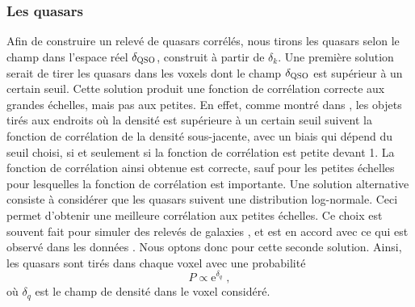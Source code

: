 \subsubsection{Les quasars}
\label{subsubsec:boiteqso}
Afin de construire un relevé de quasars corrélés, nous tirons les quasars selon le champ dans l'espace réel $\delta_{\textsc{QSO}}$, construit à partir de $\delta_k$. Une première solution serait de tirer les quasars dans les voxels dont le champ $\delta_{\textsc{QSO}}$ est supérieur à un certain seuil. Cette solution produit une fonction de corrélation correcte aux grandes échelles, mais pas aux petites.
En effet, comme montré dans \textcite{Font-Ribera2012a}, les objets tirés aux endroits où la densité est supérieure à un certain seuil suivent la fonction de corrélation de la densité sous-jacente, avec un biais qui dépend du seuil choisi, si et seulement si la fonction de corrélation est petite devant 1. La fonction de corrélation ainsi obtenue est correcte, sauf pour les petites échelles pour lesquelles la fonction de corrélation est importante.
Une solution alternative consiste à considérer que les quasars suivent une distribution log-normale. Ceci permet d'obtenir une meilleure corrélation aux petites échelles.
Ce choix est souvent fait pour simuler des relevés de galaxies \autocite{Agrawal2017}, et est en accord avec ce qui est observé dans les données \autocite{Clerkin2016}.
Nous optons donc pour cette seconde solution. Ainsi, les quasars sont tirés dans chaque voxel avec une probabilité
\begin{equation}
  \label{eq:proba_qso}
  P \propto \mathrm{e}^{\delta_q} \; ,
\end{equation}
où $\delta_q$ est le champ de densité dans le voxel considéré.

